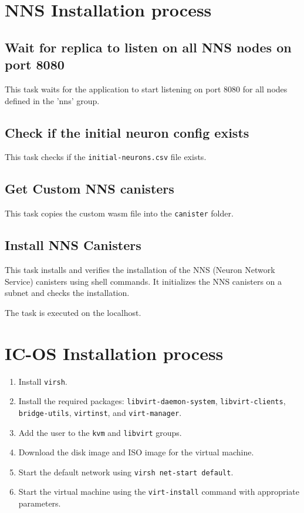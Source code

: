 \section{NNS Installation process}

\subsection{Wait for replica to listen on all NNS nodes on port 8080}

This task waits for the application to start listening on port 8080 for all nodes defined in the 'nns' group.

\subsection{Check if the initial neuron config exists}

This task checks if the \texttt{initial-neurons.csv} file exists.

\subsection{Get Custom NNS canisters}

This task copies the custom wasm file into the \texttt{canister} folder.

\subsection{Install NNS Canisters}

This task installs and verifies the installation of the NNS (Neuron Network Service) canisters using shell commands. It 
initializes the NNS canisters on a subnet and checks the installation.

The task is executed on the localhost.

\section{IC-OS Installation process}

\begin{enumerate}
    \item Install \texttt{virsh}.
    \item Install the required packages: \texttt{libvirt-daemon-system}, \texttt{libvirt-clients}, \texttt{bridge-utils}, \texttt
    {virtinst}, and \texttt{virt-manager}.
    \item Add the user to the \texttt{kvm} and \texttt{libvirt} groups.
    \item Download the disk image and ISO image for the virtual machine.
    \item Start the default network using \texttt{virsh net-start default}.
    \item Start the virtual machine using the \texttt{virt-install} command with appropriate parameters.
\end{enumerate}

